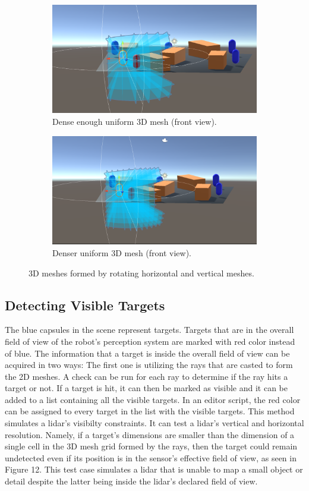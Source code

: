 \documentclass{article}
\begin{document}
\begin{figure}
\centering
\begin{subfigure}[b]{1\textwidth}
   \centering
   \includegraphics[width=0.8\linewidth]{FOV(14).png}
   \caption{Dense enough uniform 3D mesh (front view).}
\end{subfigure}
\begin{subfigure}[b]{1\textwidth}
   \centering
   \includegraphics[width=0.8\linewidth]{FOV(15).png}
   \caption{Denser uniform 3D mesh (front view).}
\end{subfigure}
\caption[]{3D meshes formed by rotating horizontal and vertical meshes.}
\end{figure}



\subsection{Detecting Visible Targets}

The blue capsules in the scene represent targets. Targets that are in the overall field of view of the robot's perception system are marked with red color instead of blue. The information that a target is inside the overall field of view can be acquired in two ways:
The first one is utilizing the rays that are casted to form the 2D meshes. A check can be run for each ray to determine if the ray hits a target or not. If a target is hit, it can then be marked as visible and it can be added to a list containing all the visible targets. In an editor script, the red color can be assigned to every target in the list with the visible targets. 
This method simulates a lidar's visibilty constraints. It can test a lidar's vertical and horizontal resolution. Namely, if a target's dimensions are smaller than the dimension of a single cell in the 3D mesh grid formed by the rays, then the target could remain undetected even if its position is in the sensor's effective field of view, as seen in Figure 12. This test case simulates a lidar that is unable to map a small object or detail despite the latter being inside the lidar's declared field of view.
\end{document}
